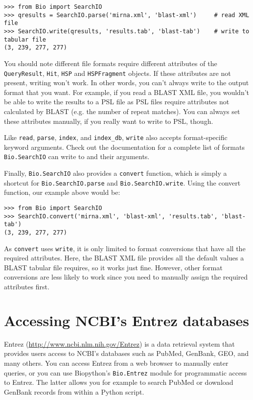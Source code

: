 \documentclass{report}
\begin{document}
\begin{verbatim}
>>> from Bio import SearchIO
>>> qresults = SearchIO.parse('mirna.xml', 'blast-xml')     # read XML file
>>> SearchIO.write(qresults, 'results.tab', 'blast-tab')    # write to tabular file
(3, 239, 277, 277)
\end{verbatim}

You should note different file formats require different attributes of the
\verb|QueryResult|, \verb|Hit|, \verb|HSP| and \verb|HSPFragment| objects. If
these attributes are not present, writing won't work. In other words, you can't
always write to the output format that you want. For example, if you read a
BLAST XML file, you wouldn't be able to write the results to a PSL file as PSL
files require attributes not calculated by BLAST (e.g. the number of repeat
matches). You can always set these attributes manually, if you really want to
write to PSL, though.

Like \verb|read|, \verb|parse|, \verb|index|, and \verb|index_db|, \verb|write|
also accepts format-specific keyword arguments. Check out the documentation for
a complete list of formats \verb|Bio.SearchIO| can write to and their arguments.

Finally, \verb|Bio.SearchIO| also provides a \verb|convert| function, which is
simply a shortcut for \verb|Bio.SearchIO.parse| and \verb|Bio.SearchIO.write|.
Using the convert function, our example above would be:

\begin{verbatim}
>>> from Bio import SearchIO
>>> SearchIO.convert('mirna.xml', 'blast-xml', 'results.tab', 'blast-tab')
(3, 239, 277, 277)
\end{verbatim}

As \verb|convert| uses \verb|write|, it is only limited to format conversions
that have all the required attributes. Here, the BLAST XML file provides all the
default values a BLAST tabular file requires, so it works just fine. However,
other format conversions are less likely to work since you need to manually
assign the required attributes first.

\chapter{Accessing NCBI's Entrez databases}
\label{chapter:entrez}

Entrez (\url{http://www.ncbi.nlm.nih.gov/Entrez}) is a data retrieval system that provides users access to NCBI's databases such as PubMed, GenBank, GEO, and many others. You can access Entrez from a web browser to manually enter queries, or you can use Biopython's \verb+Bio.Entrez+ module for programmatic access to Entrez. The latter allows you for example to search PubMed or download GenBank records from within a Python script.
\end{document}
